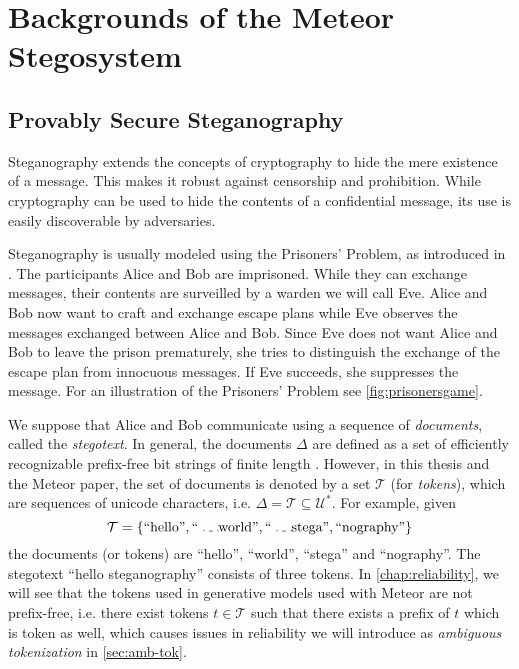 \chapter{Backgrounds of the Meteor Stegosystem}
\label{chap:previous-work}

\section{Provably Secure Steganography}
\label{sec:prov-sec-steg}

Steganography extends the concepts of cryptography to hide the mere existence of a message.
This makes it robust against censorship and prohibition.
While cryptography can be used to hide the contents of a confidential message, its use is easily discoverable by adversaries.


Steganography is usually modeled using the Prisoners' Problem, as introduced in \cite{Simmons1983}.
The participants Alice and Bob are imprisoned.
While they can exchange messages, their contents are surveilled by a warden we will call Eve.
Alice and Bob now want to craft and exchange escape plans while Eve observes the messages exchanged between Alice and Bob.
Since Eve does not want Alice and Bob to leave the prison prematurely, she tries to distinguish the exchange of the escape plan from innocuous messages.
If Eve succeeds, she suppresses the message.
For an illustration of the Prisoners' Problem see \autoref{fig:prisonersgame}.

We suppose that Alice and Bob communicate using a sequence of \emph{documents}, called the \emph{stegotext}.
In general, the documents $\Delta$ are defined as a set of efficiently recognizable prefix-free bit strings of finite length \cite{Hopper2008}.
However, in this thesis and the Meteor paper, the set of documents is denoted by a set $\mathcal{T}$ (for \emph{tokens}), which are sequences of unicode characters, i.e. $\Delta = \mathcal{T} \subseteq \mathcal{U}^*$. For example, given
$$\mathcal{T} = \{ \textrm{``hello''}, \textrm{``\Vtextvisiblespace world''}, \textrm{``\Vtextvisiblespace stega''}, \textrm{``nography''} \}$$ the documents (or tokens) are ``hello'', ``\Vtextvisiblespace world'', ``\Vtextvisiblespace stega'' and ``nography''.  
The stegotext ``hello steganography'' consists of three tokens.
In \autoref{chap:reliability}, we will see that the tokens used in generative models used with Meteor are not prefix-free, i.e. there exist tokens $t \in \mathcal{T}$ such that there exists a prefix of $t$ which is token as well, which causes issues in reliability we will introduce as \emph{ambiguous tokenization} in \autoref{sec:amb-tok}.

